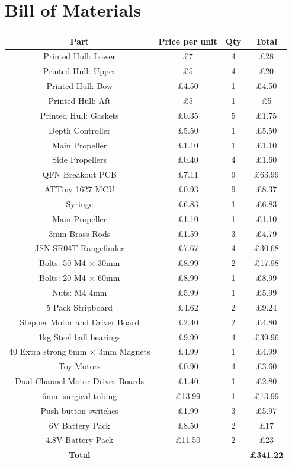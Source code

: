 \documentclass[11pt,a4paper,titlepage]{report}
\begin{document}
	\section{Bill of Materials}\label{appendix:bom}
		\begin{center}
		\begin{tabular}{ c | c | c | c }
			\hline
			\textbf{Part} & \textbf{Price per unit} & \textbf{Qty} & \textbf{Total} \\
			\hline\hline
			Printed Hull: Lower & £7 & 4 & £28 \\
			\hline
			Printed Hull: Upper & £5 & 4 & £20 \\
			\hline
			Printed Hull: Bow & £4.50 & 1 & £4.50 \\
			\hline
			Printed Hull: Aft & £5 & 1 & £5 \\
			\hline
			Printed Hull: Gaskets & £0.35 & 5 & £1.75 \\
			\hline
			Depth Controller & £5.50 & 1 & £5.50 \\
			\hline
			Main Propeller & £1.10 & 1 & £1.10 \\
			\hline
			Side Propellers & £0.40 & 4 & £1.60 \\
			\hline
			QFN Breakout PCB & £7.11 & 9 & £63.99 \\
			\hline
			ATTiny 1627 MCU & £0.93 & 9 & £8.37 \\
			\hline
			Syringe & £6.83 & 1 & £6.83 \\
			\hline
			Main Propeller & £1.10 & 1 & £1.10 \\
			\hline
			3mm Brass Rods & £1.59 & 3 & £4.79 \\
			\hline
			JSN-SR04T Rangefinder & £7.67 & 4 & £30.68 \\
			\hline
			Bolts: 50 M4 $\times$ 30mm & £8.99 & 2 & £17.98 \\
			\hline
			Bolts: 20 M4 $\times$ 60mm & £8.99 & 1 & £8.99 \\
			\hline
			Nuts: M4 4mm & £5.99 & 1 & £5.99 \\
			\hline
			5 Pack Stripboard & £4.62 & 2 & £9.24 \\
			\hline
			Stepper Motor and Driver Board & £2.40 & 2 & £4.80 \\
			\hline
			1kg Steel ball bearings & £9.99 & 4 & £39.96 \\
			\hline
			40 Extra strong 6mm $\times$ 3mm Magnets & £4.99 & 1 & £4.99 \\
			\hline
			Toy Motors & £0.90 & 4 & £3.60 \\
			\hline
			Dual Channel Motor Driver Boards & £1.40 & 1 & £2.80 \\
			\hline
			6mm surgical tubing & £13.99 & 1 & £13.99 \\
			\hline
			Push button switches & £1.99 & 3 & £5.97 \\
			\hline
			6\unit{\volt} Battery Pack & £8.50 & 2 & £17 \\
			\hline
			4.8\unit{\volt} Battery Pack & £11.50 & 2 & £23 \\
			\hline\hline
			\textbf{Total} & & & \textbf{£341.22} \\
		\end{tabular}
	\end{center}
	
\end{document}
